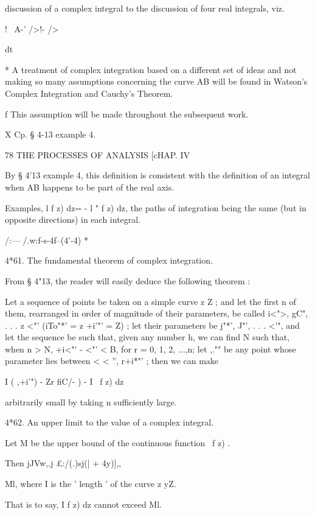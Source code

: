 discussion of a complex integral to the discussion of four real integrals, viz. 



!   \ A-' />!-  /> 



dt 



* A treatment of complex integration based on a different set of ideas and not making 
so many assumptions concerning the curve AB will be found in Watson's Complex Integration 
and Cauchy's Theorem. 

f This assumption will be made throughout the subsequent work. 

X Cp. § 4-13 example 4. 



78 THE PROCESSES OF ANALYSIS [cHAP. IV 

By § 4'13 example 4, this definition is consistent with the definition of an 
integral when AB happens to be part of the real axis. 

Examples, l f z) dz= - l " f z) dz, the paths of integration being the same (but in 
opposite directions) in each integral. 

/:— /.w:f-s-4f--(4'-4) *\   

4*61. The fundamental theorem of complex integration. 

From § 4"13, the reader will easily deduce the following theorem : 

Let a sequence of points be taken on a simple curve z Z ; and let the first 
n of them, rearranged in order of magnitude of their parameters, be called 
 i<">,  gC", . . . z <"' (iTo"*' = z    +i'"' = Z) ; let their parameters be  j"*',  J"', . . .   <'", 
and let the sequence be such that, given any number h, we can find N such 
that, when n > N,   +i<"' -  <"' < B, for r = 0, 1, 2, ...,n; let  ,."" be any point 
whose parameter lies between < < '',  r+i*"' ; then we can make 

I ( ,+i'") - Zr fiC/- ) - I \ f z) dz 

arbitrarily small by taking n sufficiently large. 

4*62. An upper limit to the value of a complex integral.   

Let M be the upper bound of the continuous function \ f z) .  

Then jJVw,.j £:/(.)sj(| + 4y)],, 

 Ml, 
where I is the ' length ' of the curve z yZ. 

That is to say, I f z) dz cannot exceed Ml. 

